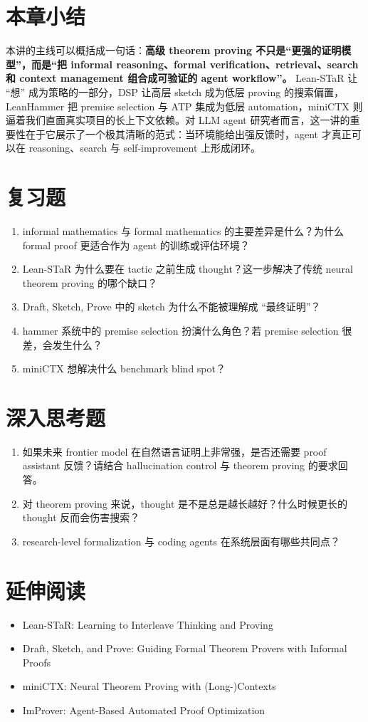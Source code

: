 \section{本章小结}

本讲的主线可以概括成一句话：\textbf{高级 theorem proving 不只是“更强的证明模型”，而是“把 informal reasoning、formal verification、retrieval、search 和 context management 组合成可验证的 agent workflow”。} Lean-STaR 让 ``想'' 成为策略的一部分，DSP 让高层 sketch 成为低层 proving 的搜索偏置，LeanHammer 把 premise selection 与 ATP 集成为低层 automation，miniCTX 则逼着我们直面真实项目的长上下文依赖。对 LLM agent 研究者而言，这一讲的重要性在于它展示了一个极其清晰的范式：当环境能给出强反馈时，agent 才真正可以在 reasoning、search 与 self-improvement 上形成闭环。

\section{复习题}
\begin{enumerate}
\item informal mathematics 与 formal mathematics 的主要差异是什么？为什么 formal proof 更适合作为 agent 的训练或评估环境？
\item Lean-STaR 为什么要在 tactic 之前生成 thought？这一步解决了传统 neural theorem proving 的哪个缺口？
\item Draft, Sketch, Prove 中的 sketch 为什么不能被理解成 ``最终证明''？
\item hammer 系统中的 premise selection 扮演什么角色？若 premise selection 很差，会发生什么？
\item miniCTX 想解决什么 benchmark blind spot？
\end{enumerate}

\section{深入思考题}
\begin{enumerate}
\item 如果未来 frontier model 在自然语言证明上非常强，是否还需要 proof assistant 反馈？请结合 hallucination control 与 theorem proving 的要求回答。
\item 对 theorem proving 来说，thought 是不是总是越长越好？什么时候更长的 thought 反而会伤害搜索？
\item research-level formalization 与 coding agents 在系统层面有哪些共同点？
\end{enumerate}

\section{延伸阅读}
\begin{itemize}
\item Lean-STaR: Learning to Interleave Thinking and Proving
\item Draft, Sketch, and Prove: Guiding Formal Theorem Provers with Informal Proofs
\item miniCTX: Neural Theorem Proving with (Long-)Contexts
\item ImProver: Agent-Based Automated Proof Optimization
\end{itemize}
